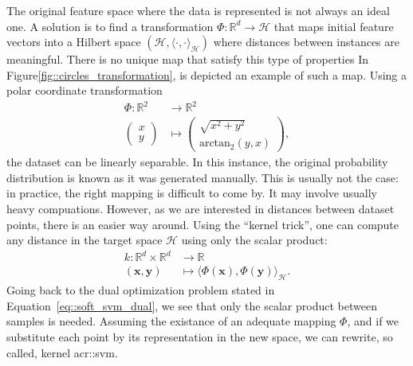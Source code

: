                 The original feature space where the data is represented is not always an ideal one.
                A solution is to find a transformation $\Phi: \mathbb{R}^d \rightarrow \mathscr{H}$ that maps initial feature vectors into a Hilbert space $(\mathscr{H}, \langle\cdot{,}\cdot\rangle_{\mathscr{H}})$ where distances between instances are meaningful.
                There is no unique map that satisfy this type of properties
                In Figure\ref{fig::circles_transformation}, is depicted an example of such a map.
                Using a polar coordinate transformation 
                \begin{align*}
                    \Phi: \mathbb{R}^2 &\rightarrow \mathbb{R}^2 \\
                    \begin{pmatrix}
                        x \\
                        y
                    \end{pmatrix} &\mapsto \begin{pmatrix}
                        \sqrt{x^2 + y^2} \\
                        \text{arctan}_2(y, x)
                    \end{pmatrix},
                \end{align*}
                the dataset can be linearly separable.
                In this instance, the original probability distribution is known as it was generated manually.
                This is usually not the case: in practice, the right mapping is difficult to come by.
                It may involve usually heavy compuations.
                However, as we are interested in distances between dataset points, there is an easier way around.
                Using the ``kernel trick'', one can compute any distance in the target space $\mathscr{H}$ using only the scalar product:
                \begin{align}
                    \label{fig::kernel_definition}
                    k: \mathbb{R}^d \times \mathbb{R}^d &\rightarrow \mathbb{R}\\
                    (\bm{x}, \bm{y}) &\mapsto \langle\Phi(\bm{x}), \Phi(\bm{y})\rangle_{\mathscr{H}} \nonumber.
                \end{align}
                Going back to the dual optimization problem stated in Equation~\ref{eq::soft_svm_dual}, we see that only the scalar product between samples is needed.
                Assuming the existance of an adequate mapping $\Phi$, and if we substitute each point by its representation in the new space, we can rewrite, so called, kernel \gls{acr::svm}.

